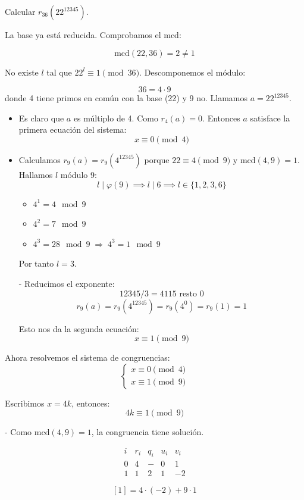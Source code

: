 \documentclass[a4paper,12pt]{article}
\begin{document}
\begin{ejemplo}[title=Ejemplo 2: mcd no es 1]
Calcular \(r_{36}(22^{12345})\).

La base ya está reducida. Comprobamos el mcd:

\[
\text{mcd}(22,36) = 2 \neq 1
\]

No existe \(l\) tal que \(22^l \equiv 1 \pmod{36}\).  
Descomponemos el módulo:

\[
36 = 4 \cdot 9
\]
donde 4 tiene primos en común con la base (22) y 9 no. Llamamos \(a = 22^{12345}\).

\begin{itemize}
    \item Es claro que $a$ es múltiplo de 4. Como \(r_4(a) = 0\).  
  Entonces $a$ satisface la primera ecuación del sistema:
  \[
  x \equiv 0 \pmod{4}
  \]
    \item Calculamos \(r_9(a) = r_9(4^{12345})\) porque \(22 \equiv 4 \pmod{9}\) y \(\text{mcd}(4,9) = 1\).  
  Hallamos \(l\) módulo 9:
  \[
    l \mid \varphi(9) \implies l \mid 6 \implies l \in \{1,2,3,6\}
    \]
  \begin{itemize}
    \item $4^1 = 4 \mod 9$
    \item $4^2 = 7 \mod 9$
    \item $4^3 = 28 \mod 9 \;\Rightarrow\; 4^3 = 1 \mod 9$
  \end{itemize}
  Por tanto \(l=3\).

- Reducimos el exponente:
\[
12345/3 = 4115 \text{ resto } 0
\]
\[
r_9(a) = r_9(4^{12345}) = r_9(4^0) = r_9(1) = 1
\]

Esto nos da la segunda ecuación:
\[
x \equiv 1 \pmod{9}
\]
\end{itemize}

Ahora resolvemos el sistema de congruencias:
\[
\begin{cases}
x \equiv 0 \pmod{4}\\
x \equiv 1 \pmod{9}
\end{cases}
\]

Escribimos \(x = 4k\), entonces:
\[
4k \equiv 1 \pmod{9}
\]

- Como \(\text{mcd}(4,9)=1\), la congruencia tiene solución.

\[
\begin{array}{c|c|c|c|c}
i & r_i & q_i & u_i & v_i \\
\hline
0 & 4 & - & 0 & 1 \\
1 & \boxed{1} & 2 & 1 & -2
\end{array}
\]

\[[1] = 4 \cdot (-2) + 9 \cdot 1\]

\end{ejemplo}
\end{document}
